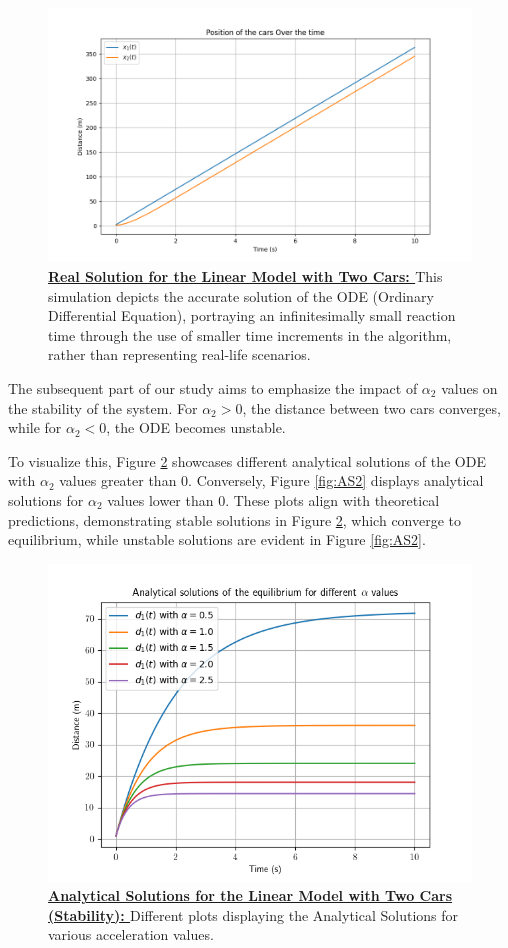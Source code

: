 \documentclass{article}
\begin{document}
		\begin{figure}[H]
			\centering
			\includegraphics[width=0.8\linewidth]{RealSolCase.png}
			\caption[Real Solution for the Linear Model with Two Cars]{\textbf{\underline{Real Solution for the Linear Model with Two Cars: }}This simulation depicts the accurate solution of the ODE (Ordinary Differential Equation), portraying an infinitesimally small reaction time through the use of smaller time increments in the algorithm, rather than representing real-life scenarios.}
			\label{fig:RS1}
		\end{figure}
		
		The subsequent part of our study aims to emphasize the impact of \(\alpha_2\) values on the stability of the system. For \(\alpha_2 > 0\), the distance between two cars converges, while for \(\alpha_2 < 0\), the ODE becomes unstable.
		
		To visualize this, Figure \ref{fig:AS1} showcases different analytical solutions of the ODE with \(\alpha_2\) values greater than 0. Conversely, Figure \ref{fig:AS2} displays analytical solutions for \(\alpha_2\) values lower than 0. These plots align with theoretical predictions, demonstrating stable solutions in Figure \ref{fig:AS1}, which converge to equilibrium, while unstable solutions are evident in Figure \ref{fig:AS2}.
		
		\begin{figure}[H]
			\centering
			\includegraphics[width=0.8\linewidth]{Stability.png}
			\caption[Analytical Solutions for the Linear Model with Two Cars]{\textbf{\underline{Analytical Solutions for the Linear Model with Two Cars (Stability): }}Different plots displaying the Analytical Solutions for various acceleration values.}
			\label{fig:AS1}
		\end{figure}
		
\end{document}
